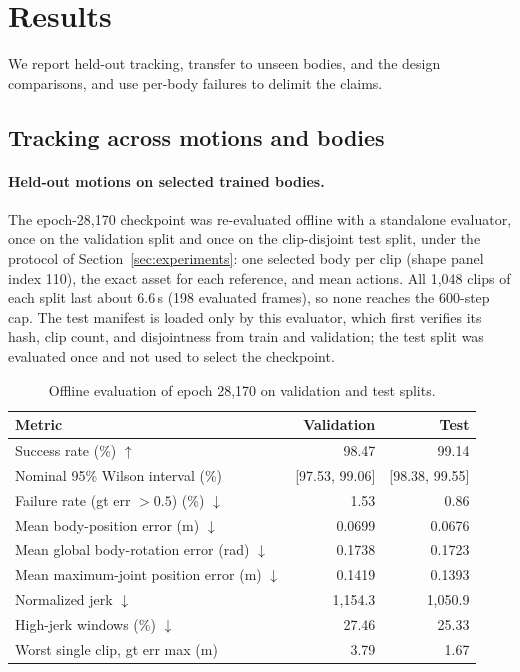 \section{Results}\label{sec:results}
We report held-out tracking, transfer to unseen bodies, and the design
comparisons, and use per-body failures to delimit the claims.

\subsection{Tracking across motions and bodies}\label{sec:tracking}

\paragraph{Held-out motions on selected trained bodies.}\label{sec:test_results}
The epoch-28,170 checkpoint was re-evaluated offline with a standalone
evaluator, once on the validation split and once on the clip-disjoint test
split, under the protocol of Section~\ref{sec:experiments}: one selected body per
clip (shape panel index 110), the exact asset for each reference, and mean
actions. All 1,048 clips of each split last about 6.6\,s (198 evaluated
frames), so none reaches the 600-step cap. The test manifest is loaded only by
this evaluator, which first verifies its hash, clip count, and disjointness from
train and validation; the test split was evaluated once and not used to select
the checkpoint.

\begin{table}[t]
\centering
\small
\caption{Offline evaluation of epoch 28,170 on validation and test splits.}\label{tab:test_results}
\begin{tabular}{lrr}
\toprule
Metric & Validation & Test \\
\midrule
Success rate (\%) $\uparrow$ & 98.47 & 99.14 \\
Nominal 95\% Wilson interval (\%) & [97.53, 99.06] & [98.38, 99.55] \\
Failure rate (gt err $>0.5$) (\%) $\downarrow$ & 1.53 & 0.86 \\
Mean body-position error (m) $\downarrow$ & 0.0699 & 0.0676 \\
Mean global body-rotation error (rad) $\downarrow$ & 0.1738 & 0.1723 \\
Mean maximum-joint position error (m) $\downarrow$ & 0.1419 & 0.1393 \\
Normalized jerk $\downarrow$ & 1,154.3 & 1,050.9 \\
High-jerk windows (\%) $\downarrow$ & 27.46 & 25.33 \\
Worst single clip, gt err max (m) & 3.79 & 1.67 \\
\bottomrule
\end{tabular}
\end{table}

